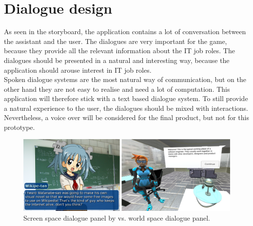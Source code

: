 \section{Dialogue design}
As seen in the storyboard, the application contains a lot of conversation between the assistant and the user. The dialogues are very important for the game, because they provide all the relevant information about the IT job roles. The dialogues should be presented in a natural and interesting way, because the application should arouse interest in IT job roles.\\
Spoken dialogue systems are the most natural way of communication, but on the other hand they are not easy to realise and need a lot of computation. This application will therefore stick with a text based dialogue system. To still provide a natural experience to the user, the dialogues should be mixed with interactions. Nevertheless, a voice over will be considered for the final product, but not for this prototype. \\
\begin{figure}[h!]
  \includegraphics[width=16cm]{kapitel/screen-vs-world-dialog.png}
  \centering
  \caption{Screen space dialogue panel by \cite{screenspace} vs. world space dialogue panel.}
  \label{fig:screen-world-dialogs}
\end{figure}
